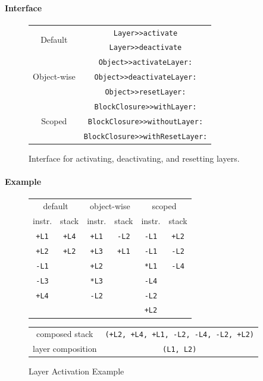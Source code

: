\documentclass{sig-alternate}
\begin{document}
\paragraph{Interface}
\begin{figure}[h]
\centering
\begin{tabular}{cc}
\multirow{2}{*}{Default} & \texttt{Layer>>activate} \\
 & \texttt{Layer>>deactivate} \\
 \hline
\multirow{3}{*}{Object-wise} & \texttt{Object>>activateLayer:} \\
 & \texttt{Object>>deactivateLayer:} \\
 & \texttt{Object>>resetLayer:} \\
 \hline
\multirow{3}{*}{Scoped} & \texttt{BlockClosure>>withLayer:} \\
 & \texttt{BlockClosure>>withoutLayer:} \\
 & \texttt{BlockClosure>>withResetLayer:} \\
\end{tabular}
\caption{Interface for activating, deactivating, and resetting layers.}
\end{figure}

\paragraph{Example}
\begin{figure}[!htp]
\centering
\begin{tabular}{cccccc}
\multicolumn{2}{c}{default} & \multicolumn{2}{c}{object-wise} & \multicolumn{2}{c}{scoped} \\
instr. & stack & instr. & stack & instr. & stack \\
\hline
\texttt{+L1} & \texttt{+L4} & \texttt{+L1} & \texttt{-L2} & \texttt{-L1} & \texttt{+L2} \\
\texttt{+L2} & \texttt{+L2} & \texttt{+L3} & \texttt{+L1} & \texttt{-L1} & \texttt{-L2} \\
\texttt{-L1} &              & \texttt{+L2} &              & \texttt{*L1} & \texttt{-L4} \\
\texttt{-L3} &              & \texttt{*L3} &              & \texttt{-L4} & \\
\texttt{+L4} &              & \texttt{-L2} &              & \texttt{-L2} & \\
             &              &              &              & \texttt{+L2} & \\
\end{tabular}
\begin{tabular}{cc}
composed stack & \texttt{(+L2, +L4, +L1, -L2, -L4, -L2, +L2)} \\
layer composition & \texttt{(L1, L2)} \\
\end{tabular}
\caption{Layer Activation Example}
\end{figure}
\end{document}
